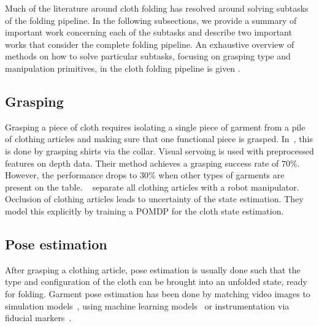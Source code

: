 Much of the literature around cloth folding has resolved around solving subtasks of the folding pipeline. In the following subsections, we provide a summary of important work concerning each of the subtasks and describe two important works that consider the complete folding pipeline. An exhaustive overview of methods on how to solve particular subtasks, focusing on grasping type and manipulation primitives, in the cloth folding pipeline is given \autocite{Borras2020}.

\subsection{Grasping}
Grasping a piece of cloth requires isolating a single piece of garment from a pile of clothing articles and making sure that one functional piece is grasped. In~\autocite{Ramisa2012}, this is done by grasping shirts via the collar. Visual servoing is used with preprocessed features on depth data. Their method achieves a grasping success rate of $70\%$. However, the performance drops to $30\%$ when other types of garments are present on the table. ~\autocite{Monso2012} separate all clothing articles with a robot manipulator. Occlusion of clothing articles leads to uncertainty of the state estimation. They model this explicitly by training a \acrshort{POMDP} for the cloth state estimation.

\subsection{Pose estimation}
After grasping a clothing article, pose estimation is usually done such that the type and configuration of the cloth can be brought into an unfolded state, ready for folding. Garment pose estimation has been done by matching video images to simulation models~\autocite{Kita2002}, using machine learning models~\autocite{Li2014, li2014volum} or instrumentation via fiducial markers~\autocite{Bersch2011}.

